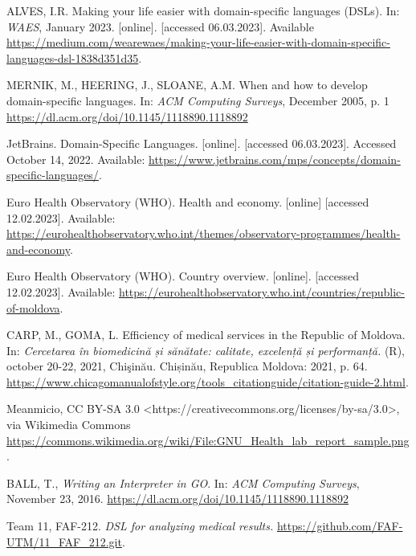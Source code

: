 \begin{thebibliography}{99}
\singlespace \normalsize


  ALVES, I.R. Making your life easier with domain-specific languages (DSLs).
  In: \emph{WAES}, January 2023.
  [online]. [accessed 06.03.2023]. Available
  \url{https://medium.com/wearewaes/making-your-life-easier-with-domain-specific-languages-dsl-1838d351d35}.

  MERNIK, M., HEERING, J., SLOANE, A.M. When and how to develop domain-specific languages.
  In: \emph{ACM Computing Surveys}, December 2005, p. 1
  \url{https://dl.acm.org/doi/10.1145/1118890.1118892}

  JetBrains. Domain-Specific Languages.
  [online]. [accessed 06.03.2023].
  Accessed October 14, 2022. Available:
  \url{https://www.jetbrains.com/mps/concepts/domain-specific-languages/}.

  Euro Health Observatory (WHO).
  Health and economy.
  [online] [accessed 12.02.2023]. Available:
  \url{https://eurohealthobservatory.who.int/themes/observatory-programmes/health-and-economy}.

  Euro Health Observatory (WHO).
  Country overview. 
  [online]. [accessed 12.02.2023]. Available:
  \url{https://eurohealthobservatory.who.int/countries/republic-of-moldova}.

  CARP, M., GOMA, L. Efficiency of medical services in the Republic of Moldova.
  In: \emph{Cercetarea în biomedicină și sănătate: calitate, excelență și performanță. }
  (R), october 20-22, 2021, Chişinău. Chișinău, Republica Moldova: 2021, p. 64.
  \url{https://www.chicagomanualofstyle.org/tools_citationguide/citation-guide-2.html}.

  Meanmicio, CC BY-SA 3.0 <https://creativecommons.org/licenses/by-sa/3.0>, via Wikimedia Commons
  \url{https://commons.wikimedia.org/wiki/File:GNU_Health_lab_report_sample.png}.

  BALL, T., \emph{Writing an Interpreter in GO}.
  In: \emph{ACM Computing Surveys}, November 23, 2016.
  \url{https://dl.acm.org/doi/10.1145/1118890.1118892}

  Team 11, FAF-212.
  \emph{DSL for analyzing medical results.}
  \url{https://github.com/FAF-UTM/11_FAF_212.git}. 
  


\end{thebibliography}
